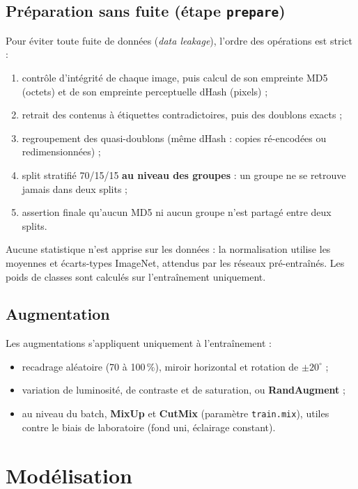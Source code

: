 \documentclass[11pt,a4paper]{article}
\begin{document}
\subsection{Préparation sans fuite (étape \texttt{prepare})}
Pour éviter toute fuite de données (\emph{data leakage}), l'ordre des opérations est strict :
\begin{enumerate}
  \item contrôle d'intégrité de chaque image, puis calcul de son empreinte MD5 (octets) et de son empreinte perceptuelle dHash (pixels) ;
  \item retrait des contenus à étiquettes contradictoires, puis des doublons exacts ;
  \item regroupement des quasi-doublons (même dHash : copies ré-encodées ou redimensionnées) ;
  \item split stratifié 70/15/15 \textbf{au niveau des groupes} : un groupe ne se retrouve jamais dans deux splits ;
  \item assertion finale qu'aucun MD5 ni aucun groupe n'est partagé entre deux splits.
\end{enumerate}
Aucune statistique n'est apprise sur les données : la normalisation utilise les moyennes et écarts-types ImageNet, attendus par les réseaux pré-entraînés. Les poids de classes sont calculés sur l'entraînement uniquement.

\subsection{Augmentation}
Les augmentations s'appliquent uniquement à l'entraînement :
\begin{itemize}
  \item recadrage aléatoire (70 à 100\,\%), miroir horizontal et rotation de $\pm20^\circ$ ;
  \item variation de luminosité, de contraste et de saturation, ou \textbf{RandAugment} ;
  \item au niveau du batch, \textbf{MixUp} et \textbf{CutMix} (paramètre \texttt{train.mix}), utiles contre le biais de laboratoire (fond uni, éclairage constant).
\end{itemize}

\section{Modélisation}
\end{document}
